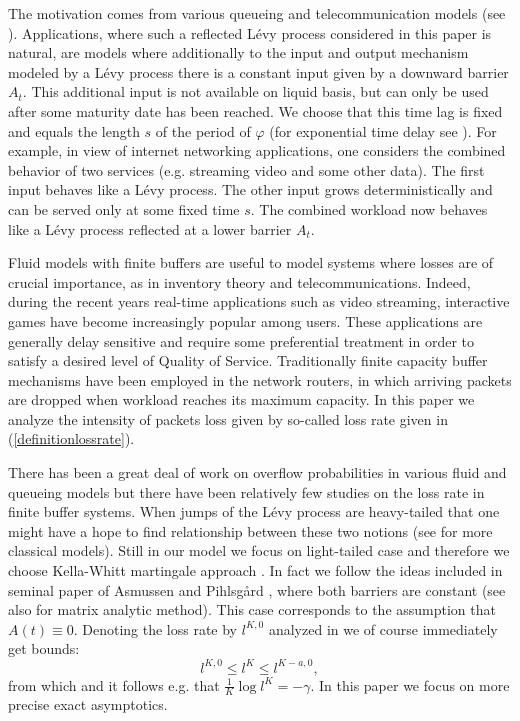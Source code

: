 \documentclass{aptpub}
\begin{document}
The motivation comes from various queueing and telecommunication models (see \cite{2,4,9,10,12,23,25}).
Applications, where such a reflected L\'{e}vy process considered in this paper is natural, are models
where additionally to the input and output mechanism
modeled by a L\'{e}vy process there is a constant input given by a downward barrier $A_t$. This additional input is not
available on liquid basis, but can only be used after some maturity date has been
reached. We choose that this time lag is fixed and equals the length $s$ of the period of $\varphi$
(for exponential time delay see \cite{KOM}).
For example, in view of internet networking applications, one considers the combined behavior of two
services (e.g. streaming video and some other data). The first input behaves like a L\'{e}vy process.
The other input grows deterministically and can be served only at some fixed time $s$.
The combined workload now behaves like
a L\'{e}vy process reflected at a lower barrier $A_t$.

Fluid models with finite buffers are useful to model systems where losses
are of crucial importance, as in inventory theory and telecommunications. Indeed,
during the recent years real-time applications such as video streaming, interactive games have become increasingly popular among users.
These applications are generally delay sensitive and require some preferential treatment in order to satisfy a desired level of  Quality of Service.
Traditionally finite capacity buffer mechanisms have been employed in the network routers, in which arriving packets are dropped when workload reaches
its maximum capacity. In this paper we analyze the intensity of packets loss given by so-called loss rate given in (\ref{definitionlossrate}).

There has been a great deal of work on overflow probabilities in various fluid and queueing models
but there have been relatively few studies on the loss rate in finite buffer systems. When jumps of the
L\'{e}vy process are heavy-tailed that one might have a hope to find relationship between these
two notions (see \cite{4,10,13} for more classical models).
Still in our model we focus on light-tailed case and therefore we choose Kella-Whitt martingale approach \cite{12}.
In fact we follow the ideas included in seminal paper of Asmussen and Pihlsg{\aa}rd \cite{AP}, where both barriers are constant
(see also \cite{miyazawa} for matrix analytic method). This case corresponds to the assumption that $A(t)\equiv 0$.
Denoting the loss rate by $l^{K,0}$ analyzed in \cite{AP} we of course immediately get bounds:
\begin{equation}\label{bounds}
l^{K,0}\leq l^K \leq l^{K-a,0},
\end{equation}
from which and \cite[Th. 4.1]{AP} it follows e.g. that $\frac{1}{K}\log l^K=-\gamma$.
In this paper we focus on more precise exact asymptotics.
\end{document}
